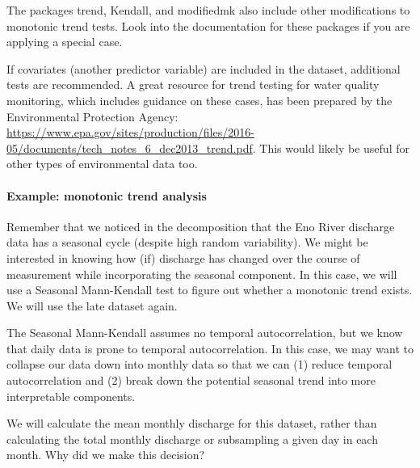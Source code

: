 \documentclass[
]{article}
\begin{document}
The packages trend, Kendall, and modifiedmk also include other
modifications to monotonic trend tests. Look into the documentation for
these packages if you are applying a special case.

If covariates (another predictor variable) are included in the dataset,
additional tests are recommended. A great resource for trend testing for
water quality monitoring, which includes guidance on these cases, has
been prepared by the Environmental Protection Agency:
\url{https://www.epa.gov/sites/production/files/2016-05/documents/tech_notes_6_dec2013_trend.pdf}.
This would likely be useful for other types of environmental data too.

\hypertarget{example-monotonic-trend-analysis}{%
\paragraph{Example: monotonic trend
analysis}\label{example-monotonic-trend-analysis}}

Remember that we noticed in the decomposition that the Eno River
discharge data has a seasonal cycle (despite high random variability).
We might be interested in knowing how (if) discharge has changed over
the course of measurement while incorporating the seasonal component. In
this case, we will use a Seasonal Mann-Kendall test to figure out
whether a monotonic trend exists. We will use the late dataset again.

The Seasonal Mann-Kendall assumes no temporal autocorrelation, but we
know that daily data is prone to temporal autocorrelation. In this case,
we may want to collapse our data down into monthly data so that we can
(1) reduce temporal autocorrelation and (2) break down the potential
seasonal trend into more interpretable components.

We will calculate the mean monthly discharge for this dataset, rather
than calculating the total monthly discharge or subsampling a given day
in each month. Why did we make this decision?
\end{document}
